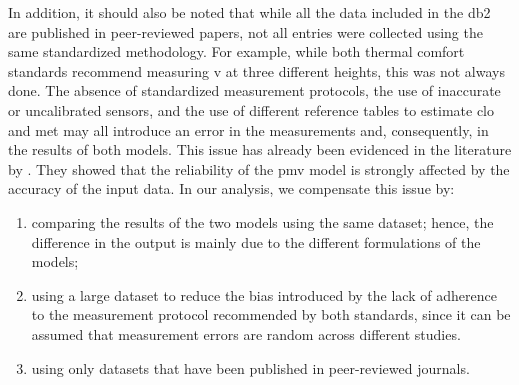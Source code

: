 In addition, it should also be noted that while all the data included in the \ac{db2} are published in peer-reviewed papers, not all entries were collected using the same standardized methodology.
For example, while both thermal comfort standards recommend measuring \ac{v} at three different heights, this was not always done.
The absence of standardized measurement protocols, the use of inaccurate or uncalibrated sensors, and the use of different reference tables to estimate \ac{clo} and \ac{met} may all introduce an error in the measurements and, consequently, in the results of both models.
This issue has already been evidenced in the literature by .
They showed that the reliability of the \ac{pmv} model is strongly affected by the accuracy of the input data.
In our analysis, we compensate this issue by:
\begin{enumerate}[ {}1{)} ]
    \item comparing the results of the two models using the same dataset; hence, the difference in the output is mainly due to the different formulations of the models;
    \item using a large dataset to reduce the bias introduced by the lack of adherence to the measurement protocol recommended by both standards, since it can be assumed that measurement errors are random across different studies.
    \item using only datasets that have been published in peer-reviewed journals.
\end{enumerate}

